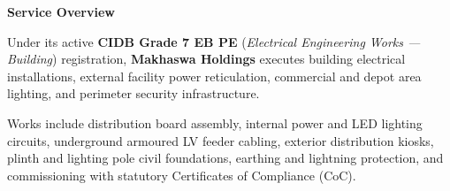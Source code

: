 \documentclass[a4paper,11pt]{article}
\begin{document}
\noindent
\begin{minipage}[t]{0.63\textwidth}
    \vspace{0pt}
    {\large\bfseries\color{mhnavy} Service Overview}
    \vspace{0.08cm}

    {\fontsize{8.7pt}{12.3pt}\selectfont\color{mhtext}
    Under its active \textbf{CIDB Grade 7 EB PE} (\textit{Electrical Engineering Works --- Building}) registration, \textbf{Makhaswa Holdings} executes building electrical installations, external facility power reticulation, commercial and depot area lighting, and perimeter security infrastructure.
    }

    \vspace{0.15cm}

    {\fontsize{8.7pt}{12.3pt}\selectfont\color{mhtext}
    Works include distribution board assembly, internal power and LED lighting circuits, underground armoured LV feeder cabling, exterior distribution kiosks, plinth and lighting pole civil foundations, earthing and lightning protection, and commissioning with statutory Certificates of Compliance (CoC).
    }
\end{minipage}
\hfill
\end{document}
